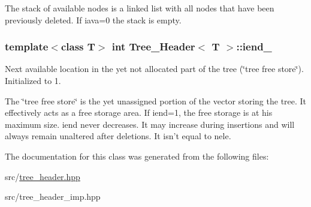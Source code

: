 The stack of available nodes is a linked list with all nodes that have been previously deleted. If iava=0 the stack is empty. \hypertarget{classTree__Header_a9f4dfb8c0a7077d7c465202d1c9c6a21}{
\subsubsection[{iend\_\-}]{\setlength{\rightskip}{0pt plus 5cm}template$<$class T$>$ int {\bf Tree\_\-Header}$<$ T $>$::{\bf iend\_\-}}}
\label{classTree__Header_a9f4dfb8c0a7077d7c465202d1c9c6a21}
Next available location in the yet not allocated part of the tree (\char`\"{}tree free store\char`\"{}). Initialized to 1.

The \char`\"{}tree free store\char`\"{} is the yet unassigned portion of the vector storing the tree. It effectively acts as a free storage area. If iend=1, the free storage is at his maximum size. iend never decreases. It may increase during insertions and will always remain unaltered after deletions. It isn't equal to nele. 

The documentation for this class was generated from the following files:\begin{DoxyCompactItemize}
\item 
src/\hyperlink{tree__header_8hpp}{tree\_\-header.hpp}\item 
src/tree\_\-header\_\-imp.hpp\end{DoxyCompactItemize}
